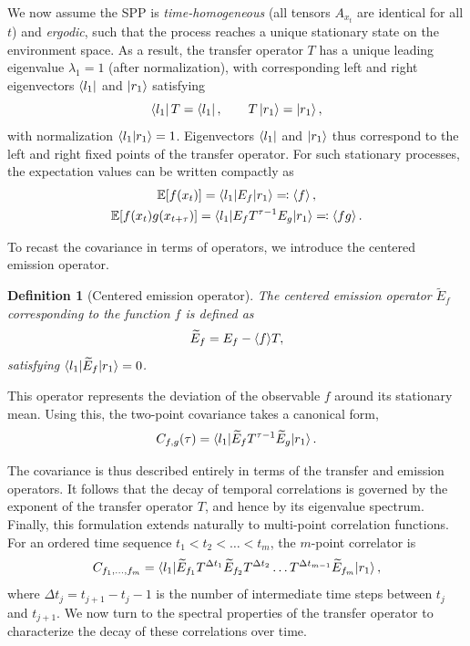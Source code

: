 \documentclass[
    aps,
    prx,
    reprint,
    superscriptaddress,
    longbibliography,
    nofootinbib,
    floatfix,
]{revtex4-2}
\newtheorem{definition}[theorem]{Definition}
\begin{document}
We now assume the SPP is \emph{time-homogeneous} (all tensors \(A_{x_t}\) are identical for all \(t\)) and \emph{ergodic}, such that the process reaches a unique stationary state on the environment space. As a result, the transfer operator \(T\) has a unique leading eigenvalue \(\lambda_1 = 1\) (after normalization), with corresponding left and right eigenvectors \(\bra{l_1}\) and \(\ket{r_1}\) satisfying
\begin{equation}
    \bra{l_1} T = \bra{l_1},
    \qquad
    T \ket{r_1} = \ket{r_1},
\end{equation}
with normalization \(\braket{l_1|r_1} = 1\). Eigenvectors \(\bra{l_1}\) and \(\ket{r_1}\) thus correspond to the left and right fixed points of the transfer operator. For such stationary processes, the expectation values can be written compactly as
\begin{equation}\label{eq:expectation-values-operator}
    \begin{gathered}
        \mathbb{E}[f(x_t)] = \braket{l_1|E_f|r_1} \eqcolon \braket{f}, \\
        \mathbb{E}[f(x_t)g(x_{t+\tau})] = \braket{l_1|E_f T^{\tau - 1} E_g|r_1} \eqcolon \braket{fg}.
    \end{gathered}
\end{equation}

To recast the covariance in terms of operators, we introduce the centered emission operator.
\begin{definition}[Centered emission operator]
    The centered emission operator \(\widetilde{E}_f\) corresponding to the function \(f\) is defined as
    \begin{equation}
        \widetilde{E}_f = E_f - \braket{f}\!T,
    \end{equation}
    satisfying \(\braket{l_1|\widetilde{E}_f|r_1} = 0\).
\end{definition}
This operator represents the deviation of the observable \(f\) around its stationary mean. Using this, the two-point covariance takes a canonical form,
\begin{equation}\label{eq:covariance_operator}
    C_{f,g}(\tau) = \braket{l_1|\widetilde{E}_f T^{\tau - 1} \widetilde{E}_g|r_1}.
\end{equation}

The covariance is thus described entirely in terms of the transfer and emission operators. It follows that the decay of temporal correlations is governed by the exponent of the transfer operator \(T\), and hence by its eigenvalue spectrum. Finally, this formulation extends naturally to multi-point correlation functions. For an ordered time sequence \(t_1 < t_2 < \dots < t_m\), the \(m\)-point correlator is
\begin{equation}
    C_{f_1,\dots,f_m} = \braket{l_1|\widetilde{E}_{f_1} T^{\Delta t_1} \widetilde{E}_{f_2} T^{\Delta t_2} \dots T^{\Delta t_{m-1}}\widetilde{E}_{f_m}|r_1},
\end{equation}
where \(\Delta t_j = t_{j+1} - t_j - 1\) is the number of intermediate time steps between \(t_j\) and \(t_{j+1}\). We now turn to the spectral properties of the transfer operator to characterize the decay of these correlations over time.
\end{document}
